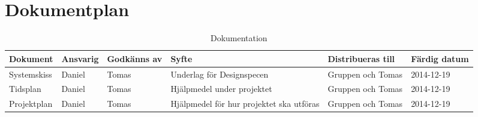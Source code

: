 \section{Dokumentplan}

\begin{table}[h]
	\centering
		\begin{tabularx}{\textwidth}{| l | l | X | X | X | l |}
			\hline
	\textbf{Dokument} & \textbf{Ansvarig} & \textbf{Godkänns av} & \textbf{Syfte} & \textbf{Distribueras till} & \textbf{Färdig datum} \\
			\hline

     {Systemskiss} & {Daniel} & {Tomas}& {Underlag för Designspecen} & {Gruppen och Tomas} & {2014-12-19} \\
      \hline
          {Tidsplan} & {Daniel} & {Tomas}& {Hjälpmedel under projektet} & {Gruppen och Tomas} & {2014-12-19} \\
      \hline
          {Projektplan} & {Daniel} & {Tomas}& {Hjälpmedel för hur projektet ska utföras} & {Gruppen och Tomas} & {2014-12-19} \\
      \hline
		\end{tabularx}
	\caption{Dokumentation} \label{dokumentation:tabell}
\end{table}